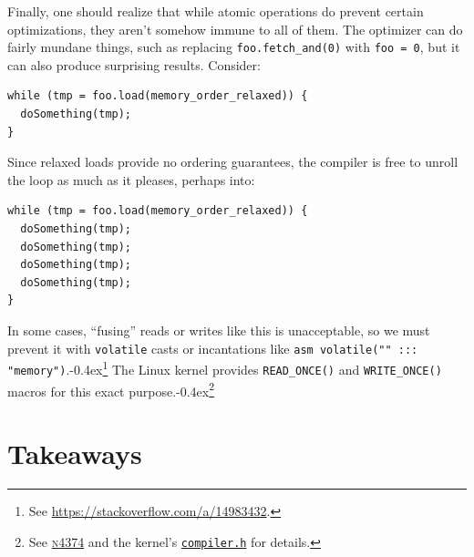 \documentclass[fontsize=10pt, numbers=endperiod]{scrartcl}
\newcommand{\codesize}{\fontsize{10pt}{12pt}}
\newcommand{\punckern}{\kern-0.4ex}
\newcommand{\monobox}[1]{\mbox{\texttt{#1}}}
\newenvironment{colfigure}
  {\par\vspace{1\baselineskip minus 0.5\baselineskip}\noindent\minipage{\linewidth}}
  {\endminipage\vspace*{1\baselineskip minus 0.7\baselineskip}}
\begin{document}
\begin{multicols}{2}
Finally, one should realize that while atomic operations do prevent certain
optimizations, they aren't somehow immune to all of them.
The optimizer can do fairly mundane things, such as replacing
\monobox{foo.fetch\_and(0)} with \monobox{foo = 0},
but it can also produce surprising results.
Consider:
\begin{colfigure}
\begin{verbatim}
while (tmp = foo.load(memory_order_relaxed)) {
  doSomething(tmp);
}
\end{verbatim}
\end{colfigure}
Since relaxed loads provide no ordering guarantees,
the compiler is free to unroll the loop as much as it pleases,
perhaps into:
\begin{colfigure}
\begin{verbatim}
while (tmp = foo.load(memory_order_relaxed)) {
  doSomething(tmp);
  doSomething(tmp);
  doSomething(tmp);
  doSomething(tmp);
}
\end{verbatim}
\end{colfigure}
In some cases, ``fusing'' reads or writes like this is unacceptable,
so we must prevent it
with \texttt{volatile} casts or incantations like
\texttt{asm volatile("" ::: "memory")}.\punckern\footnote{See
\url{https://stackoverflow.com/a/14983432}.}
The Linux kernel provides \monobox{READ\_ONCE()} and \monobox{WRITE\_ONCE()}
macros for this exact purpose.\punckern\footnote{See
\href{http://www.open-std.org/jtc1/sc22/wg21/docs/papers/2015/n4374.html}{\textsc{n}4374}
and the kernel's
\href{http://elixir.free-electrons.com/linux/latest/source/include/linux/compiler.h}{\texttt{compiler.h}}
for details.}

\section{Takeaways}


\end{multicols}
\end{document}
